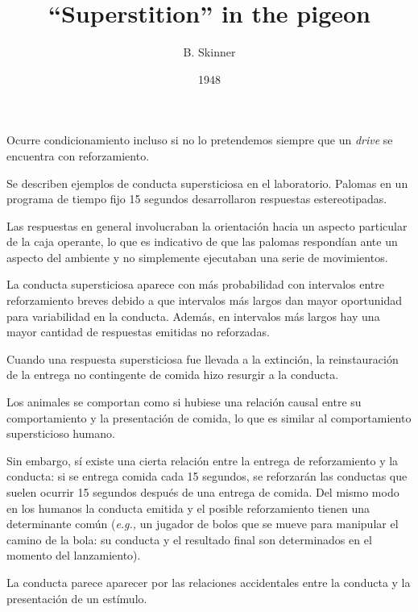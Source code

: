 \documentclass[a4paper,12pt]{article}
\title{``Superstition'' in the pigeon}
\author{B. Skinner}
\date{1948}
\begin{document}
{\scshape\bfseries \maketitle}

Ocurre condicionamiento incluso si no lo pretendemos siempre que un {\itshape drive} se encuentra con reforzamiento.

Se describen ejemplos de conducta supersticiosa en el laboratorio. Palomas en un programa de tiempo fijo 15 segundos desarrollaron respuestas estereotipadas.

Las respuestas en general involucraban la orientación hacia un aspecto particular de la caja operante, lo que es indicativo de que las palomas respondían ante un aspecto del ambiente y no simplemente ejecutaban una serie de movimientos.

La conducta supersticiosa aparece con más probabilidad con intervalos entre reforzamiento breves debido a que intervalos más largos dan mayor oportunidad para variabilidad en la conducta. Además, en intervalos más largos hay una mayor cantidad de respuestas emitidas no reforzadas.

Cuando una respuesta supersticiosa fue llevada a la extinción, la reinstauración de la entrega no contingente de comida hizo resurgir a la conducta.

Los animales se comportan como si hubiese una relación causal entre su comportamiento y la presentación de comida, lo que es similar al comportamiento supersticioso humano.

Sin embargo, sí existe una cierta relación entre la entrega de reforzamiento y la conducta: si se entrega comida cada 15 segundos, se reforzarán las conductas que suelen ocurrir 15 segundos después de una entrega de comida. Del mismo modo en los humanos la conducta emitida y el posible reforzamiento tienen una determinante común ({\itshape e.g.,} un jugador de bolos que se mueve para manipular el camino de la bola: su conducta y el resultado final son determinados en el momento del lanzamiento).

La conducta parece aparecer por las relaciones accidentales entre la conducta y la presentación de un estímulo.
\end{document}
